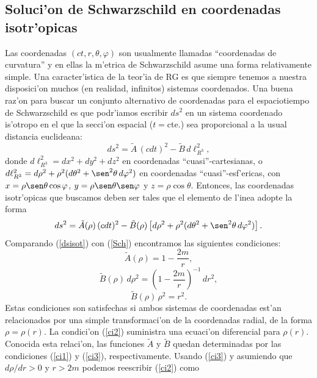 \subsection{Soluci'on de Schwarzschild en coordenadas isotr'opicas}

Las coordenadas $(ct,r,\theta,\varphi)$ son usualmente llamadas ``coordenadas de curvatura'' y en ellas la m'etrica de Schwarzschild asume una forma relativamente simple.
Una caracter'istica de la teor'ia de RG es que siempre tenemos a
nuestra disposici'on muchos (en realidad, infinitos) sistemas coordenados. Una
buena raz'on para buscar un conjunto alternativo de coordenadas para el espaciotiempo de Schwarzschild es que podr'iamos escribir $ds^2$ en un sistema coordenado is'otropo en el que la secci'on espacial ($t=$cte.) sea proporcional a la usual distancia euclideana:
\begin{equation}
ds^2=\tilde{A}\,(cdt)^2-\tilde{B}\,d\ell^2_{R^3} ,
\end{equation}
donde $d\ell^2_{R^3}=dx^2+dy^2+dz^2$ en coordenadas ``cuasi''-cartesianas, o
$d\ell^2_{R^3}=d\rho^2+\rho^2(d\theta^2+\sen^2\theta\,d\varphi^2)$ en coordenadas
``cuasi''-esf'ericas, con $x=\rho\sen\theta\cos\varphi$, $y=\rho\sen\theta\sen\varphi$ y $z=\rho\cos\theta$.
Entonces, las coordenadas isotr'opicas que buscamos deben ser tales que el elemento de l'inea adopte la forma
\begin{equation}
ds^2=\tilde{A}(\rho)\,(cdt)^2-\tilde{B}(\rho)\left[d\rho^2+\rho^2(d\theta^2+\sen^2\theta\,d\varphi^2)\right] .\label{dsisot}
\end{equation}
Comparando (\ref{dsisot}) con (\ref{Sch}) encontramos las siguientes condiciones:
\begin{equation}
 \tilde{A}(\rho)=1-\frac{2m}{r}, \label{ci1}
\end{equation}
\begin{equation}
 \tilde{B}(\rho)\,d\rho^2=\left(1-\frac{2m}{r}\right)^{-1}\,dr^2, \label{ci2}
\end{equation}
\begin{equation}
 \tilde{B}(\rho)\,\rho^2=r^2. \label{ci3}
\end{equation}
Estas condiciones son satisfechas si ambos sistemas de coordenadas est'an relacionados por una simple transformaci'on de la coordenadas radial, de la forma $\rho=\rho(r)$. La condici'on (\ref{ci2}) suministra una ecuaci'on diferencial para $\rho(r)$. Conocida esta relaci'on, las funciones $\tilde{A}$ y $\tilde{B}$ quedan determinadas por las condiciones (\ref{ci1}) y (\ref{ci3}), respectivamente. Usando (\ref{ci3}) y asumiendo que $d\rho/dr>0$ y $r>2m$ podemos reescribir (\ref{ci2}) como
